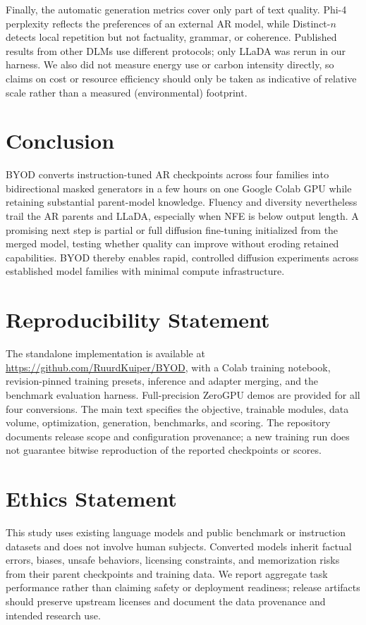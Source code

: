 \documentclass{article}
\newcommand{\method}{BYOD}
\begin{document}
Finally, the automatic generation metrics cover only part of text quality. Phi-4 perplexity reflects the preferences of an external AR model, while Distinct-$n$ detects local repetition but not factuality, grammar, or coherence. Published results from other DLMs use different protocols; only LLaDA was rerun in our harness. We also did not measure energy use or carbon intensity directly, so claims on cost or resource efficiency should only be taken as indicative of relative scale rather than a measured (environmental) footprint.

\section{Conclusion}

\method{} converts instruction-tuned AR checkpoints across four families into bidirectional masked generators in a few hours on one Google Colab GPU while retaining substantial parent-model knowledge. Fluency and diversity nevertheless trail the AR parents and LLaDA, especially when NFE is below output length. A promising next step is partial or full diffusion fine-tuning initialized from the merged model, testing whether quality can improve without eroding retained capabilities. BYOD thereby enables rapid, controlled diffusion experiments across established model families with minimal compute infrastructure.


\section*{Reproducibility Statement}

The standalone implementation is available at \url{https://github.com/RuurdKuiper/BYOD}, with a Colab training notebook, revision-pinned training presets, inference and adapter merging, and the benchmark evaluation harness. Full-precision ZeroGPU demos are provided for all four conversions. The main text specifies the objective, trainable modules, data volume, optimization, generation, benchmarks, and scoring. The repository documents release scope and configuration provenance; a new training run does not guarantee bitwise reproduction of the reported checkpoints or scores.

\section*{Ethics Statement}

This study uses existing language models and public benchmark or instruction datasets and does not involve human subjects. Converted models inherit factual errors, biases, unsafe behaviors, licensing constraints, and memorization risks from their parent checkpoints and training data. We report aggregate task performance rather than claiming safety or deployment readiness; release artifacts should preserve upstream licenses and document the data provenance and intended research use.
\end{document}
